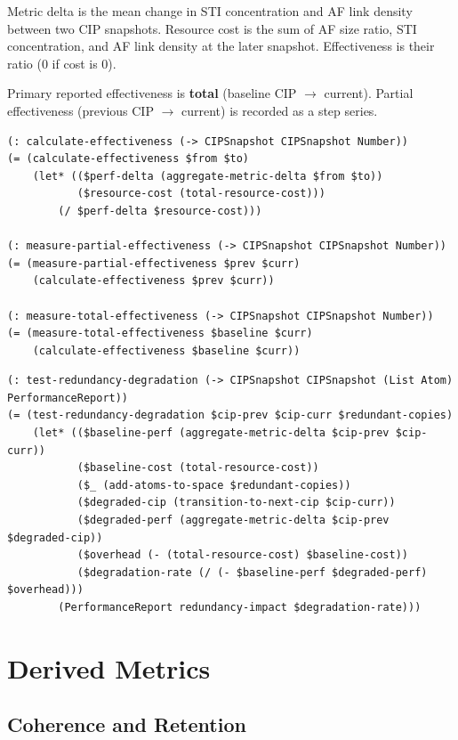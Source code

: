 \documentclass[11pt]{article}
\theoremstyle{definition}
\begin{document}
Metric delta is the mean change in STI concentration and AF link density between two CIP snapshots. Resource cost is the sum of AF size ratio, STI concentration, and AF link density at the later snapshot. Effectiveness is their ratio (0 if cost is 0).

Primary reported effectiveness is \textbf{total} (baseline CIP $\to$ current).
Partial effectiveness (previous CIP $\to$ current) is recorded as a step series.

\begin{lstlisting}[style=metta, caption=Attention Effectiveness]
(: calculate-effectiveness (-> CIPSnapshot CIPSnapshot Number))
(= (calculate-effectiveness $from $to)
    (let* (($perf-delta (aggregate-metric-delta $from $to))
           ($resource-cost (total-resource-cost)))
        (/ $perf-delta $resource-cost)))

(: measure-partial-effectiveness (-> CIPSnapshot CIPSnapshot Number))
(= (measure-partial-effectiveness $prev $curr)
    (calculate-effectiveness $prev $curr))

(: measure-total-effectiveness (-> CIPSnapshot CIPSnapshot Number))
(= (measure-total-effectiveness $baseline $curr)
    (calculate-effectiveness $baseline $curr))
\end{lstlisting}

\clearpage
\begin{lstlisting}[style=metta, caption=Redundancy]
(: test-redundancy-degradation (-> CIPSnapshot CIPSnapshot (List Atom) PerformanceReport))
(= (test-redundancy-degradation $cip-prev $cip-curr $redundant-copies)
    (let* (($baseline-perf (aggregate-metric-delta $cip-prev $cip-curr))
           ($baseline-cost (total-resource-cost))
           ($_ (add-atoms-to-space $redundant-copies))
           ($degraded-cip (transition-to-next-cip $cip-curr))
           ($degraded-perf (aggregate-metric-delta $cip-prev $degraded-cip))
           ($overhead (- (total-resource-cost) $baseline-cost))
           ($degradation-rate (/ (- $baseline-perf $degraded-perf) $overhead)))
        (PerformanceReport redundancy-impact $degradation-rate)))
\end{lstlisting}

\section{Derived Metrics}\label{sec:evaluation}

\subsection{Coherence and Retention}
\end{document}
